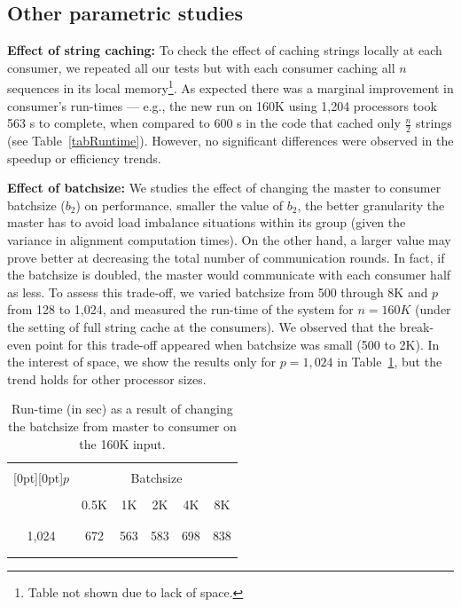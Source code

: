 \documentclass[10pt,journal,letterpaper,compsoc]{IEEEtran}
\def\colrule{\\[-7pt]\hline\\[-6pt]}
\begin{document}
\subsection{Other parametric studies}

{\bf Effect of string caching:}
To check the effect of caching strings locally at each consumer, we repeated all our tests but with each consumer caching all $n$ sequences in its local memory\footnote{Table not shown due to lack of space.}. As expected there was a marginal improvement in consumer's run-times --- e.g., the new run on 160K using 1,204 processors took 563 s to complete, when compared to 600 s in the code that cached only $\frac{n}{2}$ strings (see Table~\ref{tabRuntime}). However, no significant differences were observed in the speedup or efficiency trends. 


{\bf Effect of batchsize: }
We studies the effect of changing the master to consumer batchsize ($b_2$) on performance.  smaller the value of $b_2$, the better granularity the master has to avoid load imbalance situations within its group (given the variance in alignment computation times). On the other hand, a larger value may prove better at decreasing the total number of communication rounds. In fact, if the batchsize is doubled, the master would communicate with each consumer half as less. To assess this trade-off, we varied batchsize from 500 through 8K and $p$ from 128 to 1,024, and measured the run-time of the system for $n=160K$ (under the setting of full string cache at the consumers). We observed that the break-even point for this trade-off appeared when batchsize was small (500 to 2K). In the interest of space, we show the results only for $p=1,024$ in Table~\ref{tabBatchsize}, but the trend holds for other processor sizes. 

\begin{table}[h]
\begin{center}
\begin{tabular}{cccccc}
\colrule
\raisebox{-5pt}[0pt][0pt]{$p$}& \multicolumn{5}{c}{Batchsize } \\ \cline{2-6}\\[-7pt] & 0.5K & 1K & 2K & 4K & 8K\\
\colrule
1,024  & 672 & 563 & 583 & 698 & 838  \\
\colrule
\end{tabular}
\end{center}
\caption{\label{tabBatchsize}
Run-time (in sec) as a result of changing the batchsize from master to consumer on the 160K input. 
}
\end{table}
\end{document}
